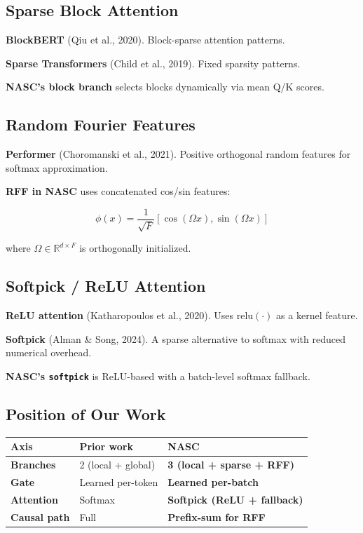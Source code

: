 \subsection{Sparse Block Attention}

\textbf{BlockBERT} (Qiu et al., 2020). Block-sparse attention patterns.

\textbf{Sparse Transformers} (Child et al., 2019). Fixed sparsity patterns.

\textbf{NASC's block branch} selects blocks dynamically via mean Q/K scores.

\subsection{Random Fourier Features}

\textbf{Performer} (Choromanski et al., 2021). Positive orthogonal random features 
for softmax approximation.

\textbf{RFF in NASC} uses concatenated cos/sin features:

\[
\phi(x) = \frac{1}{\sqrt{F}} [\cos(\Omega x), \sin(\Omega x)]
\tag{2.1}
\]

where $\Omega \in \mathbb{R}^{d \times F}$ is orthogonally initialized.

\subsection{Softpick / ReLU Attention}

\textbf{ReLU attention} (Katharopoulos et al., 2020). Uses $\text{relu}(\cdot)$ as 
a kernel feature.

\textbf{Softpick} (Alman \& Song, 2024). A sparse alternative to softmax with 
reduced numerical overhead.

\textbf{NASC's \texttt{softpick}} is ReLU-based with a batch-level softmax fallback.

\subsection{Position of Our Work}

\begin{table}[H]
\centering
\small
\begin{tabular}{lll}
\toprule
\textbf{Axis} & \textbf{Prior work} & \textbf{NASC} \\
\midrule
\textbf{Branches} & 2 (local + global) & \textbf{3 (local + sparse + RFF)} \\
\textbf{Gate} & Learned per-token & \textbf{Learned per-batch} \\
\textbf{Attention} & Softmax & \textbf{Softpick (ReLU + fallback)} \\
\textbf{Causal path} & Full & \textbf{Prefix-sum for RFF} \\
\bottomrule
\end{tabular}
\end{table}

